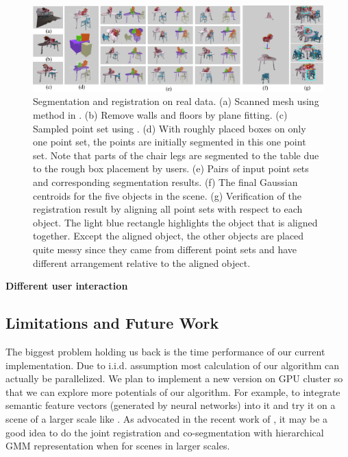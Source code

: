 \begin{figure}
	\centering
	\includegraphics[width=\linewidth]{images/realdata/realdata}
	\caption{\label{fig:realdata} Segmentation and registration on real data. (a) Scanned mesh using method in \cite{VXH}. (b) Remove walls and floors by plane fitting. (c) Sampled point set using \cite{PossionSampling}. (d) With roughly placed boxes on only one point set, the points are initially segmented in this one point set. Note that parts of the chair legs are segmented to the table due to the rough box placement by users. (e) Pairs of input point sets and corresponding segmentation results. (f) The final Gaussian centroids for the five objects in the scene. (g) Verification of the registration result by aligning all point sets with respect to each object. The light blue rectangle highlights the object that is aligned together. Except the aligned object, the other objects are placed quite messy since they came from different point sets and have different arrangement relative to the aligned object.   }
\end{figure} 
\textbf{Different user interaction}
\subsection{Limitations and Future Work}
The biggest problem holding us back is the time performance of our current implementation.  Due to i.i.d. assumption most calculation of our algorithm can actually be parallelized. We plan to implement a new version on GPU cluster so that we can explore more potentials of our algorithm. 
For example, to integrate semantic feature vectors (generated by neural networks) into it and try it on a scene of a larger scale like \cite{GOGMA}. 
As advocated in the recent work of \cite{AGM}, it may be a good idea to do the joint registration and co-segmentation with hierarchical GMM representation when for scenes in larger scales. 
